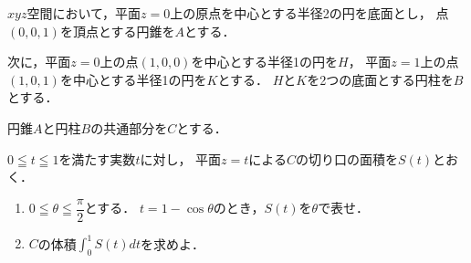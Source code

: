 \documentclass[../../main.tex]{subfiles}
\begin{document}
$xyz$空間において，平面$z=0$上の原点を中心とする半径2の円を底面とし，
点$(0,0,1)$を頂点とする円錐を$A$とする．

次に，平面$z=0$上の点$(1,0,0)$を中心とする半径1の円を$H$，
平面$z=1$上の点$(1,0,1)$を中心とする半径1の円を$K$とする．
$H$と$K$を2つの底面とする円柱を$B$とする．

円錐$A$と円柱$B$の共通部分を$C$とする．

$0 \leqq t \leqq 1$を満たす実数$t$に対し，
平面$z=t$による$C$の切り口の面積を$S(t)$とおく．
\begin{enumerate}
  \item $\displaystyle 0 \leqq \theta \leqq \dfrac{\pi}{2}$とする．
    $t=1-\cos\theta$のとき，$S(t)$を$\theta$で表せ．
  \item $C$の体積$\displaystyle\int_0^1S(t)dt$を求めよ．
\end{enumerate}
\end{document}

